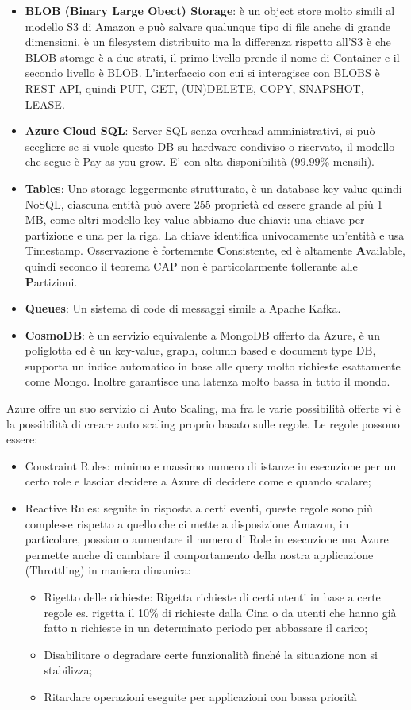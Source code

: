 \documentclass[11pt, twocolumn]{article}
\newenvironment{myitemize}
{ \begin{itemize}[topsep=0ex]
		\setlength{\itemsep}{0pt}
		\setlength{\parskip}{0pt}
		\setlength{\parsep}{0pt}     }
	{ \end{itemize}                  }
\begin{document}
\begin{itemize}[noitemsep, topsep=0ex, wide]
	\item \textbf{BLOB (Binary Large Obect) Storage}: è un object store molto simili al modello S3 di Amazon e può salvare qualunque tipo di file anche di grande dimensioni, è un filesystem distribuito ma la differenza rispetto all'S3 è che BLOB storage è a due strati, il primo livello prende il nome di Container e il secondo livello è BLOB.
	L'interfaccio con cui si interagisce con BLOBS è REST API, quindi PUT, GET, (UN)DELETE, COPY, SNAPSHOT, LEASE. 
	\item \textbf{Azure Cloud SQL}: Server SQL senza overhead amministrativi, si può scegliere se si vuole questo DB su hardware condiviso o riservato, il modello che segue è Pay-as-you-grow. 
	E' con alta disponibilità ($99.99\%$ mensili). 
	\item \textbf{Tables}: Uno storage leggermente strutturato, è un database key-value quindi NoSQL, ciascuna entità può avere 255 proprietà ed essere grande al più 1 MB, come altri modello key-value abbiamo due chiavi: una chiave per partizione e una per la riga. La chiave identifica univocamente un'entità e usa Timestamp.
	Osservazione è fortemente \textbf{C}onsistente, ed è altamente \textbf{A}vailable, quindi secondo il teorema CAP non è particolarmente tollerante alle \textbf{P}artizioni.
	\item \textbf{Queues}: Un sistema di code di messaggi simile a Apache Kafka.
	\item \textbf{CosmoDB}: è un servizio equivalente a MongoDB offerto da Azure, è un poliglotta ed è un key-value, graph, column based e document type DB, supporta un indice automatico in base alle query molto richieste esattamente come Mongo.
	Inoltre garantisce una latenza molto bassa in tutto il mondo.
\end{itemize}
Azure offre un suo servizio di Auto Scaling, ma fra le varie possibilità offerte vi è la possibilità di creare auto scaling proprio basato sulle regole. Le regole possono essere:
\begin{myitemize}
	\item Constraint Rules: minimo e massimo numero di istanze in esecuzione per un certo role e lasciar decidere a Azure di decidere come e quando scalare;
	\item Reactive Rules: seguite in risposta a certi eventi, queste regole sono più complesse rispetto a quello che ci mette a disposizione Amazon, in particolare, possiamo aumentare il numero di Role in esecuzione ma Azure permette anche di cambiare il comportamento della nostra applicazione (Throttling) in maniera dinamica:
	\begin{myitemize}
		\item Rigetto delle richieste: Rigetta richieste di certi utenti in base a certe regole es. rigetta il 10\% di richieste dalla Cina o da utenti che hanno già fatto n richieste in un determinato periodo per abbassare il carico;
		\item Disabilitare o degradare certe funzionalità finché la situazione non si stabilizza;
		\item Ritardare operazioni eseguite per applicazioni con bassa priorità
	\end{myitemize}
\end{myitemize}
\end{document}
